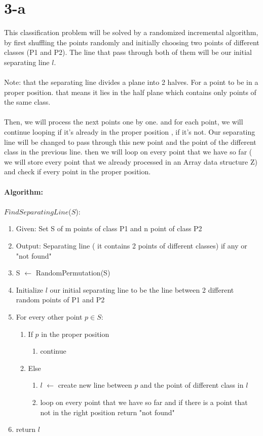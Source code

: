 
\section*{3-a}
This classification problem will be solved by a randomized incremental algorithm, by first shuffling the points randomly and initially choosing two points of different classes (P1 and P2). The line that pass through both  of them will be our initial separating line $l$. \\
\\
Note: that the separating line divides a plane into 2 halves. For a point to be in a proper position. that means it lies in the half plane which contains only points of the same class. \\
\\
Then, we will process the next points one by one. and for each point, we will continue looping if it's already in the proper position , if it's not. Our separating line will be changed to pass through this new point and the point of the different class in the previous line. then we will loop on every point that we have so far ( we will store every point that we already processed in an Array data structure Z) and check if every point in the proper position. 
\\
\\
\textbf{Algorithm:}\\
\\
$FindSeparatingLine$($S$):
\begin{enumerate}
\item Given: Set S of m points of class P1 and n point of class P2 
\item Output: Separating line ( it contains 2 points of different classes) if any or "not found"

\item S $\leftarrow$ RandomPermutation(S) 
\item Initialize $l$ our initial separating line to be the line between 2 different random points of P1 and P2
\item For every other point  $p  \in S$:
\begin{enumerate}
\item If $p$ in the proper position
\begin{enumerate}
\item continue 
\end{enumerate}
\item Else  
   \begin{enumerate}
\item $l$  $\leftarrow$ create new line between $p$ and the point of different class in $l$ 
\item loop on every point that we have so far and if there is a point that not in the right position return "not found"

\end{enumerate}    
        
\end{enumerate}

\item return $l$
\end{enumerate}
